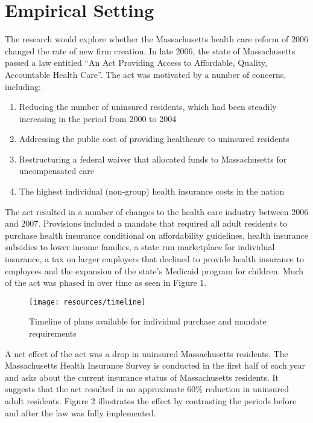 \documentclass[12pt]{article}
\begin{document}
\section{Empirical Setting}

The research would explore whether the Massachusetts health care reform of 2006 changed the rate of new firm creation. In late 2006, the state of Massachusetts passed a law entitled ``An Act Providing Access to Affordable, Quality, Accountable Health Care''. The act was motivated by a number of concerns, including:

\begin{enumerate}
\item Reducing the number of uninsured residents, which had been steadily increasing in the period from 2000 to 2004 \cite{bisweek}
\item Addressing the public cost of providing healthcare to uninsured residents \cite{npr}
\item Restructuring a federal waiver that allocated funds to Massachusetts for uncompensated care \cite{heritage}
\item The highest individual (non-group) health insurance costs in the nation \cite{gruber}
\end{enumerate}

The act resulted in a number of changes to the health care industry between 2006 and 2007. Provisions included a mandate that required all adult residents to purchase health insurance conditional on affordability guidelines, health insurance subsidies to lower income families, a state run marketplace for individual insurance, a tax on larger employers that declined to provide health insurance to employees and the expansion of the state's Medicaid program for children. Much of the act was phased in over time as seen in Figure 1.

\begin{figure}[H]
	\centering
	\texttt{[image: resources/timeline]}
	\caption{Timeline of plans available for individual purchase and mandate requirements}
\end{figure}

A net effect of the act was a drop in uninsured Massachusetts residents. The Massachusetts Health Insurance Survey is conducted in the first half of each year and asks about the current insurance status of Massachusetts residents. It suggests that the act resulted in an approximate 60\% reduction in uninsured adult residents. Figure 2 illustrates the effect by contrasting the periods before and after the law was fully implemented. 
\end{document}
